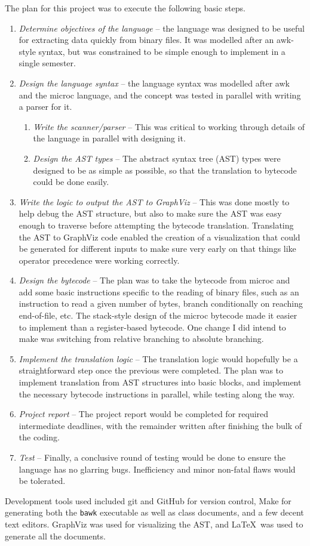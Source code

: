 The plan for this project was to execute the following basic steps.

\begin{enumerate}
\item \textsl{Determine objectives of the language} -- the language was designed to be useful for extracting data quickly from binary files.  It was modelled after an awk-style syntax, but was constrained to be simple enough to implement in a single semester.

\item \textsl{Design the language syntax} -- the language syntax was modelled after awk and the microc language, and the concept was tested in parallel with writing a parser for it.
\begin{enumerate}
	\item \textsl{Write the scanner/parser} -- This was critical to working through details of the language in parallel with designing it.
	\item \textsl{Design the AST types} -- The abstract syntax tree (AST) types were designed to be as simple as possible, so that the translation to bytecode could be done easily.
\end{enumerate}

\item \textsl{Write the logic to output the AST to GraphViz} -- This was done mostly to help debug the AST structure, but also to make sure the AST was easy enough to traverse before attempting the bytecode translation.  Translating the AST to GraphViz code enabled the creation of a visualization that could be generated for different inputs to make sure very early on that things like operator precedence were working correctly.

\item \textsl{Design the bytecode} -- The plan was to take the bytecode from microc and add some basic instructions specific to the reading of binary files, such as an instruction to read a given number of bytes, branch conditionally on reaching end-of-file, etc.  The stack-style design of the microc bytecode made it easier to implement than a register-based bytecode.  One change I did intend to make was switching from relative branching to absolute branching.

\item \textsl{Implement the translation logic} -- The translation logic would hopefully be a straightforward step once the previous were completed.  The plan was to implement translation from AST structures into basic blocks, and implement the necessary bytecode instructions in parallel, while testing along the way.

\item \textsl{Project report} -- The project report would be completed for required intermediate deadlines, with the remainder written after finishing the bulk of the coding.

\item \textsl{Test} -- Finally, a conclusive round of testing would be done to ensure the language has no glarring bugs.  Inefficiency and minor non-fatal flaws would be tolerated.
\end{enumerate}

Development tools used included git and GitHub for version control, Make for generating both the \texttt{bawk} executable as well as class documents, and a few decent text editors.  GraphViz was used for visualizing the AST, and \LaTeX\ was used to generate all the documents.